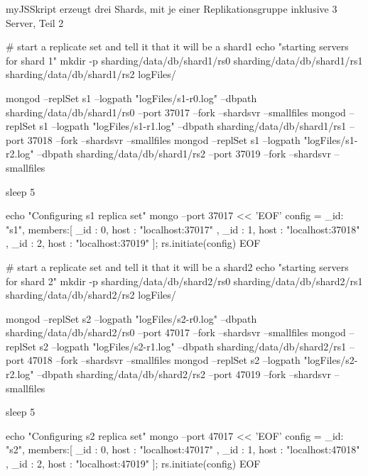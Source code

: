 \begin{listingsboxJavaScript}[label={lst:createShards2}]{myJS}{Skript erzeugt drei Shards, mit je einer Replikationsgruppe inklusive 3 Server, Teil 2}

# start a replicate set and tell it that it will be a shard1
echo "starting servers for shard 1"
mkdir -p sharding/data/db/shard1/rs0 sharding/data/db/shard1/rs1 
sharding/data/db/shard1/rs2 logFiles/

mongod --replSet s1 --logpath "logFiles/s1-r0.log" 
--dbpath sharding/data/db/shard1/rs0 --port 37017 --fork --shardsvr --smallfiles
mongod --replSet s1 --logpath "logFiles/s1-r1.log" 
--dbpath sharding/data/db/shard1/rs1 --port 37018 --fork --shardsvr --smallfiles
mongod --replSet s1 --logpath "logFiles/s1-r2.log" 
--dbpath sharding/data/db/shard1/rs2 --port 37019 --fork --shardsvr --smallfiles

sleep 5

echo "Configuring s1 replica set"
mongo --port 37017 << 'EOF'
config = { _id: "s1", members:[
          { _id : 0, host : "localhost:37017" },
          { _id : 1, host : "localhost:37018" },
          { _id : 2, host : "localhost:37019" }]};
rs.initiate(config)
EOF

# start a replicate set and tell it that it will be a shard2
echo "starting servers for shard 2"
mkdir -p sharding/data/db/shard2/rs0 sharding/data/db/shard2/rs1 
sharding/data/db/shard2/rs2 logFiles/

mongod --replSet s2 --logpath "logFiles/s2-r0.log" 
--dbpath sharding/data/db/shard2/rs0 --port 47017 --fork --shardsvr --smallfiles
mongod --replSet s2 --logpath "logFiles/s2-r1.log" 
--dbpath sharding/data/db/shard2/rs1 --port 47018 --fork --shardsvr --smallfiles
mongod --replSet s2 --logpath "logFiles/s2-r2.log" 
--dbpath sharding/data/db/shard2/rs2 --port 47019 --fork --shardsvr --smallfiles

sleep 5

echo "Configuring s2 replica set"
mongo --port 47017 << 'EOF'
config = { _id: "s2", members:[
          { _id : 0, host : "localhost:47017" },
          { _id : 1, host : "localhost:47018" },
          { _id : 2, host : "localhost:47019" }]};
rs.initiate(config)
EOF
\end{listingsboxJavaScript}


